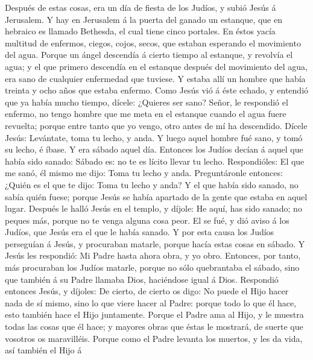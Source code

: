  Después de estas cosas, era un día de fiesta de los
Judíos, y subió Jesús á Jerusalem.  Y hay en Jerusalem á
la puerta del ganado un estanque, que en hebraico es llamado Bethesda,
el cual tiene cinco portales.  En éstos yacía multitud de
enfermos, ciegos, cojos, secos, que estaban esperando el movimiento del
agua.  Porque un ángel descendía á cierto tiempo al
estanque, y revolvía el agua; y el que primero descendía en el estanque
después del movimiento del agua, era sano de cualquier enfermedad que
tuviese.  Y estaba allí un hombre que había treinta y ocho
años que estaba enfermo.  Como Jesús vió á éste echado, y
entendió que ya había mucho tiempo, dícele: ¿Quieres ser sano?
 Señor, le respondió el enfermo, no tengo hombre que me
meta en el estanque cuando el agua fuere revuelta; porque entre tanto
que yo vengo, otro antes de mí ha descendido.  Dícele
Jesús: Levántate, toma tu lecho, y anda.  Y luego aquel
hombre fué sano, y tomó su lecho, é íbase. Y era sábado aquel día.
 Entonces los Judíos decían á aquel que había sido
sanado: Sábado es: no te es lícito llevar tu lecho. 
Respondióles: El que me sanó, él mismo me dijo: Toma tu lecho y anda.
 Preguntáronle entonces: ¿Quién es el que te dijo: Toma
tu lecho y anda?  Y el que había sido sanado, no sabía
quién fuese; porque Jesús se había apartado de la gente que estaba en
aquel lugar.  Después le halló Jesús en el templo, y
díjole: He aquí, has sido sanado; no peques más, porque no te venga
alguna cosa peor.  El se fué, y dió aviso á los Judíos,
que Jesús era el que le había sanado.  Y por esta causa
los Judíos perseguían á Jesús, y procuraban matarle, porque hacía estas
cosas en sábado.  Y Jesús les respondió: Mi Padre hasta
ahora obra, y yo obro.  Entonces, por tanto, más
procuraban los Judíos matarle, porque no sólo quebrantaba el sábado,
sino que también á su Padre llamaba Dios, haciéndose igual á Dios.
 Respondió entonces Jesús, y díjoles: De cierto, de
cierto os digo: No puede el Hijo hacer nada de sí mismo, sino lo que
viere hacer al Padre: porque todo lo que él hace, esto también hace el
Hijo juntamente.  Porque el Padre ama al Hijo, y le
muestra todas las cosas que él hace; y mayores obras que éstas le
mostrará, de suerte que vosotros os maravilléis.  Porque
como el Padre levanta los muertos, y les da vida, así también el Hijo á
